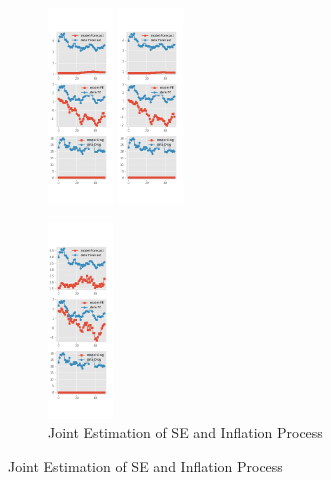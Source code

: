\documentclass[]{article}
\begin{document}
\begin{figure}[ht]
\begin{subfigure}[b]{\textwidth}
		\includegraphics[width=0.19\textwidth]{figures/sce_se_est_diag3.png}
		\includegraphics[width=0.19\textwidth]{figures/sce_se_est_diag4.png}
	\end{subfigure}
	\vspace{1em}
	\vfill
	\begin{subfigure}[b]{\textwidth}
		\centering
		\caption{Joint Estimation of SE and Inflation Process}
		\label{SE_diag_joint_SCE}
		\includegraphics[width=0.19\textwidth]{figures/sce_se_est_joint_diag0.png}

\end{subfigure}
\end{figure}
\end{document}
